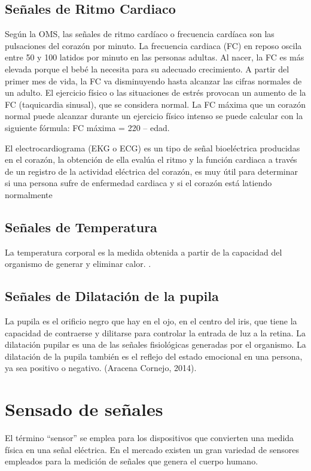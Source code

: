\subsection{Señales de Ritmo Cardiaco}
Según la OMS, las señales de ritmo cardíaco o frecuencia cardíaca son las pulsaciones del corazón por minuto. 
La frecuencia cardiaca (FC) en reposo oscila entre 50 y 100 latidos por minuto en las personas adultas. Al nacer, la FC es más elevada porque el bebé la necesita para su adecuado crecimiento. A partir del primer mes de vida, la FC va disminuyendo hasta alcanzar las cifras normales de un adulto. 
	El ejercicio físico o las situaciones de estrés provocan un aumento de la FC (taquicardia sinusal), que se considera normal. La FC máxima que un corazón normal puede alcanzar durante un ejercicio físico intenso se puede calcular con la siguiente fórmula: FC máxima = 220 – edad.

El electrocardiograma (EKG o ECG) es un tipo de señal bioeléctrica producidas en el corazón, la obtención de ella evalúa el ritmo y la función cardiaca a través de un registro de la actividad eléctrica del corazón, es muy útil para determinar si una persona sufre de enfermedad cardiaca y si el corazón está latiendo normalmente \cite{wilches}

\subsection{Señales de Temperatura}
La temperatura corporal es la medida obtenida a partir de la capacidad del organismo de generar y eliminar calor. \cite{wilches}. 


\subsection{Señales de Dilatación de la pupila}

La pupila es el orificio negro que hay en el ojo, en el centro del iris, que tiene la capacidad de contraerse y dilitarse para controlar la entrada de luz a la retina. La dilatación pupilar es una de las señales fisiológicas generadas por el organismo. La dilatación de la pupila también es el reflejo del estado emocional en una persona, ya sea positivo o negativo. (Aracena Cornejo, 2014).

\section{Sensado de señales}

El término “sensor” se emplea para los dispositivos que convierten una medida física en una señal eléctrica. En el mercado existen un gran variedad de sensores empleados para la medición de señales que genera el cuerpo humano.

